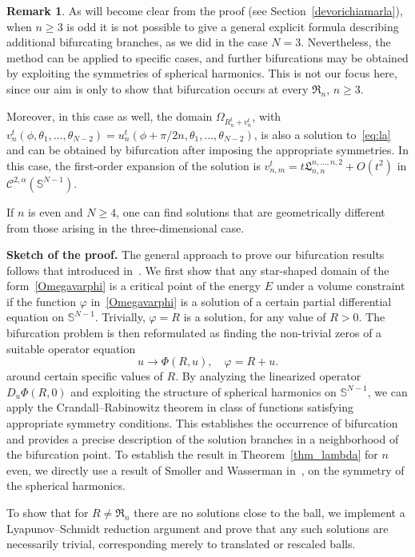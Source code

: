 \documentclass[10pt,reqno,english]{amsart}
\newcommand{\Sn}{\mathbb{S}^{N-1}}
\newcommand{\rn}{{\mathfrak R}_n  }
\theoremstyle{definition}
\newtheorem{remark}[lemma]{Remark}
\numberwithin{equation}{section}
\begin{document}
\begin{remark}
As will become clear from the proof (see Section~\ref{devorichiamarla}), when $n \ge 3$ is odd it is not possible to give a general explicit formula describing additional bifurcating branches, as we did in the case $N=3$. Nevertheless, the method can be applied to specific cases, and further bifurcations may be obtained by exploiting the symmetries of spherical harmonics. This is not our focus here, since our aim is only to show that bifurcation occurs at every $\rn$, $n \ge 3$.

Moreover,  in this case as well, the domain $\Omega_{R_n^t+v_n^t}$, with $v_n^t (\phi,\theta_1,\dots,\theta_{N-2}) = u_n^t (\phi+\pi/2n,\theta_1,\dots,\theta_{N-2})$, is also a solution to~\eqref{eq:la} and can be obtained by bifurcation after imposing the appropriate symmetries. In this case, the first-order expansion of the solution is $v_{n,m}^t=t \mathfrak L^{n,\dots,n,2}_{n,n} +O(t^2)$ in $\mathcal C^{2,\alpha}(\Sn)$.


If $n$ is even and $N \ge 4$, one can find solutions that are geometrically different from those arising in the three-dimensional case.
 \end{remark}


\medskip
\noindent\textbf{Sketch of the proof.}
The general approach to prove our bifurcation results  follows that introduced in~\cite{Fr19}. We first show that any star-shaped domain of the form~\eqref{Omegavarphi} is a critical point of the energy  $E$
 under a volume constraint if the function $\varphi$ in~\eqref{Omegavarphi} is a solution of a certain partial differential equation on $\Sn$. Trivially, $\varphi = R$ is a solution, for any value of $R>0$. The bifurcation  problem is then reformulated as finding the non-trivial zeros of a suitable operator equation
 \[
 u \to \Phi (R,u), \quad \varphi = R+u.
 \]
 around certain specific values of $R$.
 By analyzing the linearized operator $D_u \Phi (R,0)$ and exploiting the structure of spherical harmonics on $\Sn$, we can apply the Crandall–Rabinowitz theorem in class of functions satisfying  appropriate symmetry conditions. This establishes the occurrence of bifurcation and provides a precise description of the solution branches in a neighborhood of the bifurcation point.
To establish the result in Theorem~\ref{thm_lambda} for $n$ even, we directly use a result of Smoller and  Wasserman in~\cite{SM90}, on the symmetry of the spherical harmonics.

To show that for $R \neq \rn$ there are no solutions close to the ball, we implement a Lyapunov--Schmidt reduction argument and prove that any such solutions are necessarily trivial, corresponding merely to translated or rescaled balls.
\end{document}
